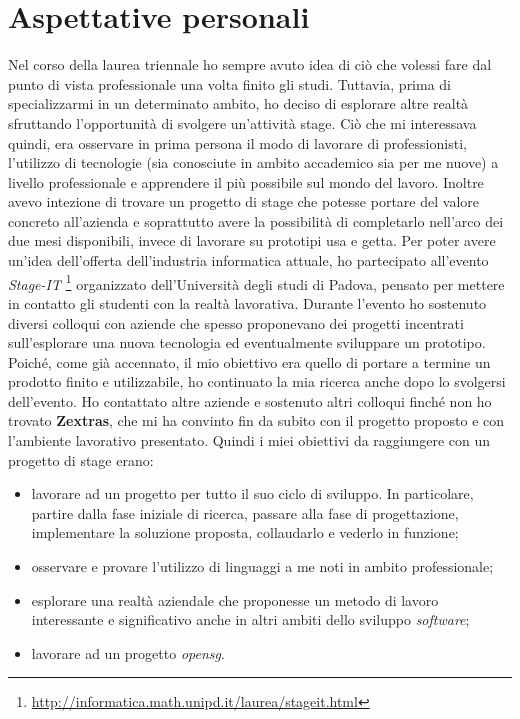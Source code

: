 \section{Aspettative personali}\label{sec:aspettative_personali}
Nel corso della laurea triennale ho sempre avuto idea di ciò che volessi fare dal punto di vista professionale una volta finito gli studi. Tuttavia, prima di specializzarmi in un determinato ambito, ho deciso di esplorare altre realtà sfruttando l'opportunità di svolgere un'attività stage. Ciò che mi interessava quindi, era osservare in prima persona il modo di lavorare di professionisti, l'utilizzo di tecnologie (sia conosciute in ambito accademico sia per me nuove) a livello professionale e apprendere il più possibile sul mondo del lavoro. Inoltre avevo intezione di trovare un progetto di stage che potesse portare del valore concreto all'azienda e soprattutto avere la possibilità di completarlo nell'arco dei due mesi disponibili, invece di lavorare su prototipi usa e getta.
Per poter avere un'idea dell'offerta dell'industria informatica attuale, ho partecipato all'evento \textit{Stage-IT} \footnote{\url{http://informatica.math.unipd.it/laurea/stageit.html}} organizzato dell'Università degli studi di Padova, pensato per mettere in contatto gli studenti con la realtà lavorativa. Durante l'evento ho sostenuto diversi colloqui con aziende che spesso proponevano dei progetti incentrati sull'esplorare una nuova tecnologia ed eventualmente sviluppare un prototipo. Poiché, come già accennato, il mio obiettivo era quello di portare a termine un prodotto finito e utilizzabile, ho continuato la mia ricerca anche dopo lo svolgersi dell'evento. Ho contattato altre aziende e sostenuto altri colloqui finché non ho trovato \textbf{Zextras}, che mi ha convinto fin da subito con il progetto proposto e con l'ambiente lavorativo presentato. Quindi i miei obiettivi da raggiungere con un progetto di stage erano:
\begin{itemize}
    \item lavorare ad un progetto per tutto il suo ciclo di sviluppo. In particolare, partire dalla fase iniziale di ricerca, passare alla fase di progettazione, implementare la soluzione proposta, collaudarlo e vederlo in funzione;
    \item osservare e provare l'utilizzo di linguaggi a me noti in ambito professionale;
    \item esplorare una realtà aziendale che proponesse un metodo di lavoro interessante e significativo anche in altri ambiti dello sviluppo \textit{software};
    \item lavorare ad un progetto \textit{\gls{opensg}}.
\end{itemize}
